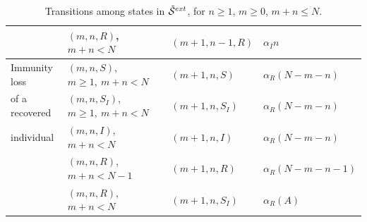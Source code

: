 \documentclass[preprint,12pt]{elsarticle}
\begin{document}
\begin{table}
{\begin{tabular}{|l|l|l|l|}
 & $(m,n,R)$, $m+n<N$ & $(m+1,n-1,R)$ & $\alpha_I n$\\
\hline
Immunity loss & $(m,n,S)$, $m\geq1,\ m+n<N$ & $(m+1,n,S)$ & $\alpha_R (N-m-n)$\\
of a recovered & $(m,n,S_I)$, $m\geq1,\ m+n<N$ & $(m+1,n,S_I)$ & $\alpha_R (N-m-n)$\\
individual & $(m,n,I)$, $m+n<N$ & $(m+1,n,I)$ & $\alpha_R (N-m-n)$\\
 & $(m,n,R)$, $m+n<N-1$ & $(m+1,n,R)$ & $\alpha_R (N-m-n-1)$\\
 & $(m,n,R)$, $m+n<N$ & $(m+1,n,S_I)$ & $\alpha_R(A)$\\
\hline
\end{tabular}
\caption{Transitions among states in ${\cal \tilde S}^{ext}$, for $n\geq1$, $m\geq0$, $m+n\leq N$.}
\label{tab:2}}
\end{table}
\end{document}
